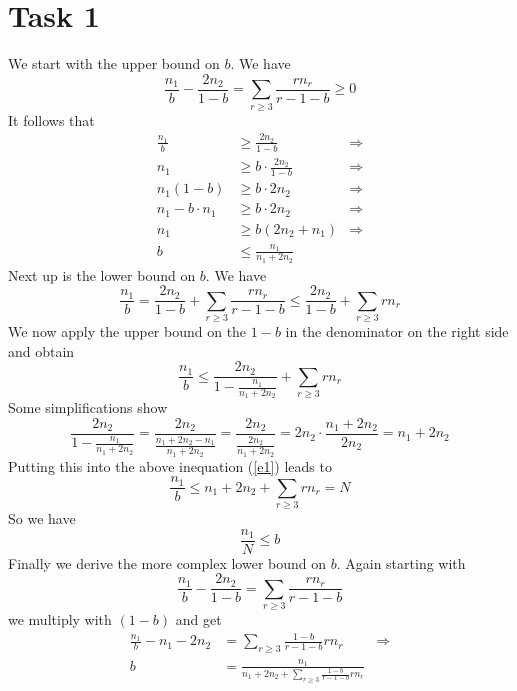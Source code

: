 \documentclass[%
   11pt,              %
   ngerman,           %
   a4paper,           %
   DIV11,             %
]{scrartcl}%
\begin{document}
\section*{Task 1}
We start with the upper bound on $b$. We have
\begin{equation*}
	\frac{n_1}{b} - \frac{2n_2}{1-b} = \sum_{r \geq 3}\frac{r n_r}{r - 1 - b} \geq 0
\end{equation*}
It follows that
\begin{align*}
	\frac{n_1}{b} &\geq \frac{2 n_2}{1-b} &\Rightarrow \\
	n_1 &\geq b\cdot\frac{2n_2}{1-b} &\Rightarrow \\
	n_1(1-b) &\geq b \cdot 2 n_2 &\Rightarrow \\
	n_1 - b \cdot n_1 &\geq b \cdot 2 n_2 &\Rightarrow \\
	n_1 &\geq b(2 n_2 + n_1) &\Rightarrow \\
	b &\leq \frac{n_1}{n_1 + 2 n_2}
\end{align*}
Next up is the lower bound on $b$. We have
\begin{equation*}
	\frac{n_1}{b} = \frac{2 n_2}{1-b} + \sum_{r \geq 3}\frac{r n_r}{r - 1 - b} \leq \frac{2 n_2}{1-b} + \sum_{r \geq 3}r n_r
\end{equation*}
We now apply the upper bound on the $1-b$ in the denominator on the right side and obtain
\begin{equation}\label{e1}
	\frac{n_1}{b} \leq \frac{2 n_2}{1 - \frac{n_1}{n_1 + 2n_2}} + \sum_{r \geq 3}r n_r
\end{equation}
Some simplifications show
\begin{equation*}
	\frac{2 n_2}{1 - \frac{n_1}{n_1 + 2n_2}} = \frac{2n_2}{\frac{n_1+2n_2-n_1}{n_1+2n_2}} = \frac{2n_2}{\frac{2n_2}{n_1+2n_2}} = 2n_2 \cdot \frac{n_1+2n_2}{2n_2} = n_1 + 2n_2
\end{equation*}
Putting this into the above inequation (\ref{e1}) leads to
\begin{equation*}
	\frac{n_1}{b} \leq n_1 + 2n_2 + \sum_{r \geq 3}r n_r = N
\end{equation*}
So we have
\begin{equation*}
	\frac{n_1}{N} \leq b
\end{equation*}
Finally we derive the more complex lower bound on $b$. Again starting with
\begin{equation*}
	\frac{n_1}{b} - \frac{2n_2}{1-b} = \sum_{r \geq 3}\frac{r n_r}{r - 1 - b} 
\end{equation*}
we multiply with $(1-b)$ and get
\begin{align*}
	\frac{n_1}{b} - n_1 - 2n_2 &= \sum_{r \geq 3}\frac{1-b}{r-1-b}rn_r &\Rightarrow \\
	b &= \frac{n_1}{n_1 + 2n_2 + \sum_{r \geq 3}\frac{1-b}{r-1-b}rn_r}
\end{align*}
\end{document}
